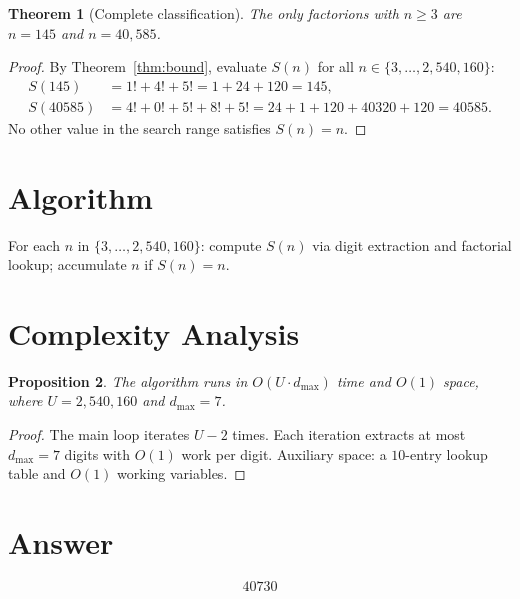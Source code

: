 \documentclass[12pt]{article}
\newtheorem{theorem}{Theorem}
\newtheorem{proposition}[theorem]{Proposition}
\theoremstyle{definition}
\begin{document}
\begin{theorem}[Complete classification]
The only factorions with $n \ge 3$ are $n = 145$ and $n = 40{,}585$.
\end{theorem}

\begin{proof}
By Theorem~\ref{thm:bound}, evaluate $S(n)$ for all $n \in \{3, \ldots, 2{,}540{,}160\}$:
\begin{align}
S(145) &= 1! + 4! + 5! = 1 + 24 + 120 = 145, \\
S(40585) &= 4! + 0! + 5! + 8! + 5! = 24 + 1 + 120 + 40320 + 120 = 40585.
\end{align}
No other value in the search range satisfies $S(n) = n$.
\end{proof}

\section{Algorithm}
For each $n$ in $\{3, \ldots, 2{,}540{,}160\}$: compute $S(n)$ via digit extraction and factorial lookup; accumulate $n$ if $S(n) = n$.

\section{Complexity Analysis}

\begin{proposition}
The algorithm runs in $O(U \cdot d_{\max})$ time and $O(1)$ space, where $U = 2{,}540{,}160$ and $d_{\max} = 7$.
\end{proposition}

\begin{proof}
The main loop iterates $U - 2$ times. Each iteration extracts at most $d_{\max} = 7$ digits with $O(1)$ work per digit. Auxiliary space: a $10$-entry lookup table and $O(1)$ working variables.
\end{proof}

\section{Answer}

\[
\boxed{40730}
\]
\end{document}
